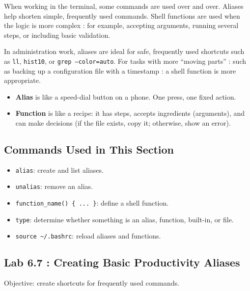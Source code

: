 When working in the terminal, some commands are used over and over. Aliases
help shorten simple, frequently used commands. Shell functions are used when
the logic is more complex : for example, accepting arguments, running several
steps, or including basic validation.

In administration work, aliases are ideal for safe, frequently used shortcuts
such as \texttt{ll}, \texttt{hist10}, or \texttt{grep --color=auto}. For
tasks with more ``moving parts'' : such as backing up a configuration file
with a timestamp : a shell function is more appropriate.

\begin{examplebox}
  \begin{itemize}
    \item \textbf{Alias} is like a speed-dial button on a phone. One press,
      one fixed action.
    \item \textbf{Function} is like a recipe: it has steps, accepts
      ingredients (arguments), and can make decisions (if the file exists,
      copy it; otherwise, show an error).
  \end{itemize}
\end{examplebox}

\subsection*{Commands Used in This Section}

\begin{itemize}
  \item \texttt{alias}: create and list aliases.
  \item \texttt{unalias}: remove an alias.
  \item \texttt{function\_name() \{ ... \}}: define a shell function.
  \item \texttt{type}: determine whether something is an alias, function,
    built-in, or file.
  \item \texttt{source \textasciitilde/.bashrc}: reload aliases and functions.
\end{itemize}

\subsection*{Lab 6.7 : Creating Basic Productivity Aliases}

Objective: create shortcuts for frequently used commands.

